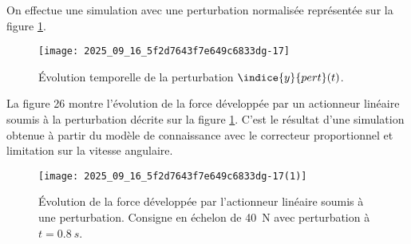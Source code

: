 \ifprof
\begin{corrige}
\end{corrige}
\else
\fi

On effectue une simulation avec une perturbation normalisée représentée sur la figure \ref{ccs_mp_2023_fig_25}.


\begin{figure}[!h]
\centering
\texttt{[image: 2025\_09\_16\_5f2d7643f7e649c6833dg-17]}
\caption{\label{ccs_mp_2023_fig_25}  Évolution temporelle de la perturbation $\indice{y}{pert}(t)$.}

\end{figure}



La figure 26 montre l'évolution de la force développée par un actionneur linéaire soumis à la perturbation décrite sur la figure \ref{ccs_mp_2023_fig_25}. C'est le résultat d'une simulation obtenue à partir du modèle de connaissance avec le correcteur proportionnel et limitation sur la vitesse angulaire.
%


\begin{figure}[!h]
\centering
\texttt{[image: 2025\_09\_16\_5f2d7643f7e649c6833dg-17(1)]}
\caption{\label{ccs_mp_2023_fig_26}   Évolution de la force développée par l'actionneur linéaire soumis à une perturbation. Consigne en échelon de \SI{40}{N} avec perturbation à $t=\SI{0,8}{s}$.}

\end{figure}



